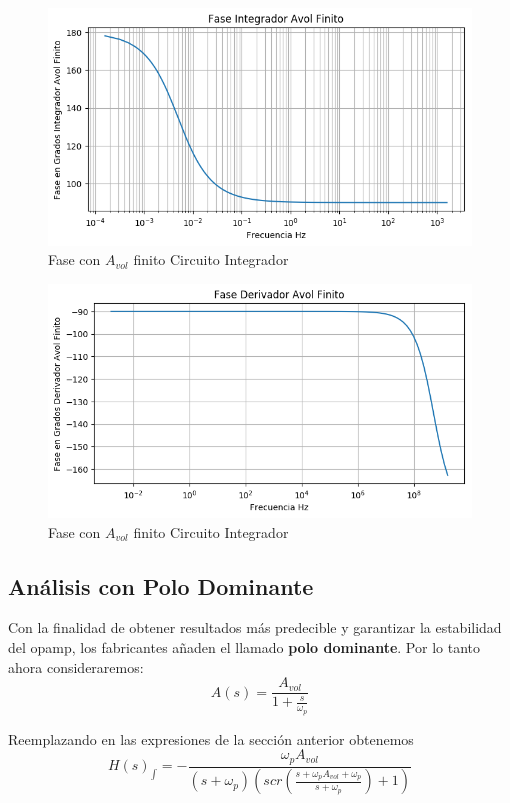 \documentclass[a4paper]{article}
\begin{document}
\begin{figure}[H]
	\centering
	\includegraphics[width=\textwidth]{Ejercicio4/BODE-AVOL-FINITO-FASE-INTEGRADOR}
	\caption{Fase con $A_{vol}$ finito Circuito Integrador}
\end{figure}

\begin{figure}[H]
	\centering
	\includegraphics[width=\textwidth]{Ejercicio4/BODE-AVOL-FINITO-FASE-DERIVADOR}
	\caption{Fase con $A_{vol}$ finito Circuito Integrador}
\end{figure}

\subsection{Análisis con Polo Dominante}
Con la finalidad de obtener resultados más predecible y garantizar la estabilidad del opamp, los fabricantes añaden el llamado \textbf{polo dominante}.
Por lo tanto ahora consideraremos:
$$A(s)=\frac{A_{vol}}{1+\frac{s}{\omega_p}}$$

Reemplazando en las expresiones de la sección anterior obtenemos
$$H(s)_{\int}=- \frac{\omega_p A_{vol}}{\left(s + \omega_p\right) \left(s c r{\left (\frac{s + \omega_p A_{vol} + \omega_p}{s + \omega_p} \right )} + 1\right)}$$
\end{document}
